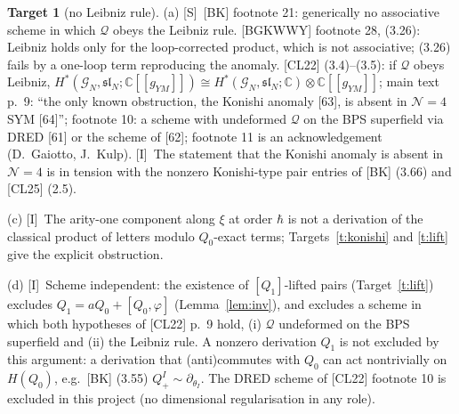 \documentclass[11pt]{article}
\theoremstyle{definition}
\newtheorem{target}{Target}
\newcommand{\Sl}{\textup{[S]}}
\newcommand{\Il}{\textup{[I]}}
\begin{document}
\begin{target}[no Leibniz rule]\label{t:leibniz}
(a) \Sl\ [BK] footnote 21: generically no associative scheme in which $\mathcal Q$ obeys the Leibniz rule. [BGKWWY] footnote 28, (3.26): Leibniz holds only for the loop-corrected product, which is not associative; (3.26) fails by a one-loop term reproducing the anomaly. [CL22] (3.4)--(3.5): if $\mathcal Q$ obeys Leibniz, $H^*(\mathcal G_N,\mathfrak{sl}_N;\mathbb C[[g_{YM}]])\cong H^*(\mathcal G_N,\mathfrak{sl}_N;\mathbb C)\otimes\mathbb C[[g_{YM}]]$; main text p.~9: ``the only known obstruction, the Konishi anomaly [63], is absent in $\mathcal N=4$ SYM [64]''; footnote 10: a scheme with undeformed $\mathcal Q$ on the BPS superfield via DRED [61] or the scheme of [62]; footnote 11 is an acknowledgement (D.~Gaiotto, J.~Kulp). \Il\ The statement that the Konishi anomaly is absent in $\mathcal N=4$ is in tension with the nonzero Konishi-type pair entries of [BK] (3.66) and [CL25] (2.5).

(c) \Il\ The arity-one component along $\xi$ at order $\hbar$ is not a derivation of the classical product of letters modulo $Q_0$-exact terms; Targets~\ref{t:konishi} and \ref{t:lift} give the explicit obstruction.

(d) \Il\ Scheme independent: the existence of $[Q_1]$-lifted pairs (Target~\ref{t:lift}) excludes $Q_1=aQ_0+[Q_0,\varphi]$ (Lemma~\ref{lem:inv}), and excludes a scheme in which both hypotheses of [CL22] p.~9 hold, (i) $\mathcal Q$ undeformed on the BPS superfield and (ii) the Leibniz rule. A nonzero derivation $Q_1$ is not excluded by this argument: a derivation that (anti)commutes with $Q_0$ can act nontrivially on $H(Q_0)$, e.g.\ [BK] (3.55) $Q^I_+\sim\partial_{\theta_I}$. The DRED scheme of [CL22] footnote 10 is excluded in this project (no dimensional regularisation in any role).
\end{target}
\end{document}
